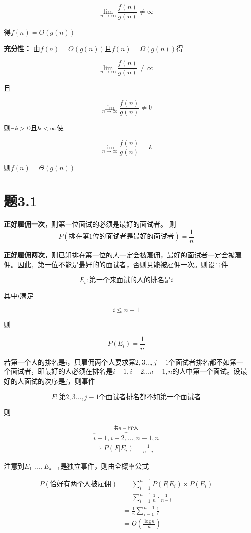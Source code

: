 \documentclass[a4paper,twoside]{article}
\begin{document}
\begin{spacing}{1.2}
$$
\lim_{n \to \infty}\frac{f(n)}{g(n)} \ne \infty
$$

得$f(n)=O(g(n))$

\textbf{充分性：}
由$f(n)=O(g(n))$且$f(n)=\Omega(g(n))$得

$$
\lim_{n \to \infty}\frac{f(n)}{g(n)} \ne \infty
$$

且

$$
\lim_{n \to \infty}\frac{f(n)}{g(n)} \ne 0
$$

则$\exists k>0$且$k<\infty$使

$$
\lim_{n \to \infty}\frac{f(n)}{g(n)} = k
$$

则$f(n)=\Theta(g(n))$

\section{题3.1}

\textbf{正好雇佣一次}，则第一位面试的必须是最好的面试者。
则
$$
P(\mbox{排在第$1$位的面试者是最好的面试者})=\frac{1}{n}
$$

\textbf{正好雇佣两次}，则已知排在第一位的人一定会被雇佣，最好的面试者一定会被雇佣。因此，第一位不能是最好的的面试者，否则只能被雇佣一次。则设事件

$$
E_i: \mbox{第一个来面试的人的排名是$i$}
$$

其中$i$满足

$$
i \le n-1
$$

则

$$
P(E_i)=\frac{1}{n}
$$

若第一个人的排名是$i$，只雇佣两个人要求第$2, 3 \dots ,j-1$个面试者排名都不如第一个面试者，即最好的人必须在排名是$i+1, i+2 \dots n-1, n$的人中第一个面试。设最好的人面试的次序是$j$，则事件

$$
F: \mbox{第$2, 3 \dots ,j-1$个面试者排名都不如第一个面试者}
$$

则

\begin{align*}
	\overbrace{i+1, i+2, \dots, n-1, n}^{\mbox{共$n-i$个人}} \\
	\Rightarrow P(F|E_i) = \frac{1}{n-i} 
\end{align*}

注意到$E_1, \dots, E_{n-1}$是独立事件，则由全概率公式

\begin{align*}
	P(\mbox{恰好有两个人被雇佣}) &= \sum_{i=1}^{n-1}{P(F|E_i)\times P(E_i)} \\
	&= \sum_{i=1}^{n-1}\frac{1}{n} \cdot \frac{1}{n-i} \\
	&= \frac{1}{n}\sum_{i=1}^{n-1}\frac{1}{i} \\
	&= O(\frac{\log n}{n})
\end{align*}


\end{spacing}
\end{document}
